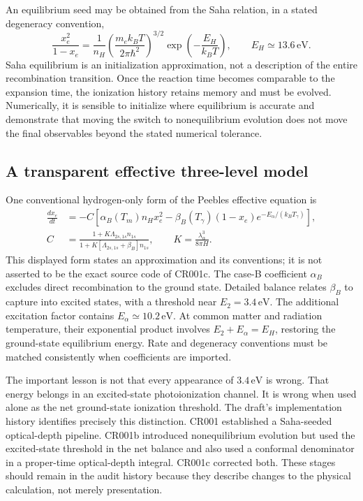 An equilibrium seed may be obtained from the Saha relation, in a stated degeneracy convention,
\begin{equation}
 \frac{x_e^2}{1-x_e}=\frac{1}{n_H}
 \left(\frac{m_e k_BT}{2\pi\hbar^2}\right)^{3/2}
 \exp\!\left(-\frac{E_H}{k_BT}\right),\qquad E_H\simeq13.6\,\mathrm{eV}.
 \label{c9:saha}
\end{equation}
Saha equilibrium is an initialization approximation, not a description of the entire recombination transition. Once the reaction time becomes comparable to the expansion time, the ionization history retains memory and must be evolved. Numerically, it is sensible to initialize where equilibrium is accurate and demonstrate that moving the switch to nonequilibrium evolution does not move the final observables beyond the stated numerical tolerance.

\subsection{A transparent effective three-level model}

One conventional hydrogen-only form of the Peebles effective equation is
\begin{align}
 \frac{dx_e}{dt}&=-C\left[\alpha_B(T_m)n_Hx_e^2
 -\beta_B(T_\gamma)(1-x_e)e^{-E_\alpha/(k_BT_\gamma)}\right],
 \label{c9:peebles}\\
 C&=\frac{1+K\Lambda_{2s,1s}n_{1s}}
 {1+K[\Lambda_{2s,1s}+\beta_B]n_{1s}},\qquad
 K=\frac{\lambda_\alpha^3}{8\pi H}.
 \label{c9:cfactor}
\end{align}
This displayed form states an approximation and its conventions; it is not asserted to be the exact source code of CR001c. The case-B coefficient $\alpha_B$ excludes direct recombination to the ground state. Detailed balance relates $\beta_B$ to capture into excited states, with a threshold near $E_2=3.4\,\mathrm{eV}$. The additional excitation factor contains $E_\alpha\simeq10.2\,\mathrm{eV}$. At common matter and radiation temperature, their exponential product involves $E_2+E_\alpha=E_H$, restoring the ground-state equilibrium energy. Rate and degeneracy conventions must be matched consistently when coefficients are imported.

The important lesson is not that every appearance of $3.4\,\mathrm{eV}$ is wrong. That energy belongs in an excited-state photoionization channel. It is wrong when used alone as the net ground-state ionization threshold. The draft's implementation history identifies precisely this distinction. CR001 established a Saha-seeded optical-depth pipeline. CR001b introduced nonequilibrium evolution but used the excited-state threshold in the net balance and also used a conformal denominator in a proper-time optical-depth integral. CR001c corrected both. These stages should remain in the audit history because they describe changes to the physical calculation, not merely presentation.

